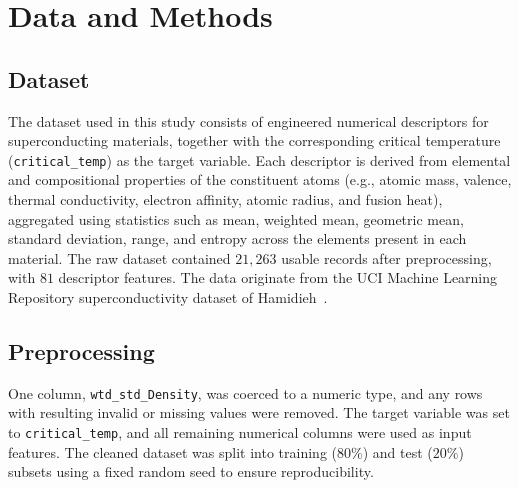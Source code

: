 \documentclass[11pt]{article}
\begin{document}
\section{Data and Methods}

\subsection{Dataset}
The dataset used in this study consists of engineered numerical descriptors for superconducting materials,
together with the corresponding critical temperature (\texttt{critical\_temp}) as the target variable. Each
descriptor is derived from elemental and compositional properties of the constituent atoms (e.g., atomic
mass, valence, thermal conductivity, electron affinity, atomic radius, and fusion heat), aggregated using
statistics such as mean, weighted mean, geometric mean, standard deviation, range, and entropy across the
elements present in each material. The raw dataset contained $21{,}263$ usable records after
preprocessing, with $81$ descriptor features. The data originate from the UCI Machine Learning Repository
superconductivity dataset of Hamidieh~\cite{hamidieh2018}.

\subsection{Preprocessing}
One column, \texttt{wtd\_std\_Density}, was coerced to a numeric type, and any rows with resulting invalid
or missing values were removed. The target variable was set to \texttt{critical\_temp}, and all remaining
numerical columns were used as input features. The cleaned dataset was split into training ($80\%$) and
test ($20\%$) subsets using a fixed random seed to ensure reproducibility.
\end{document}
